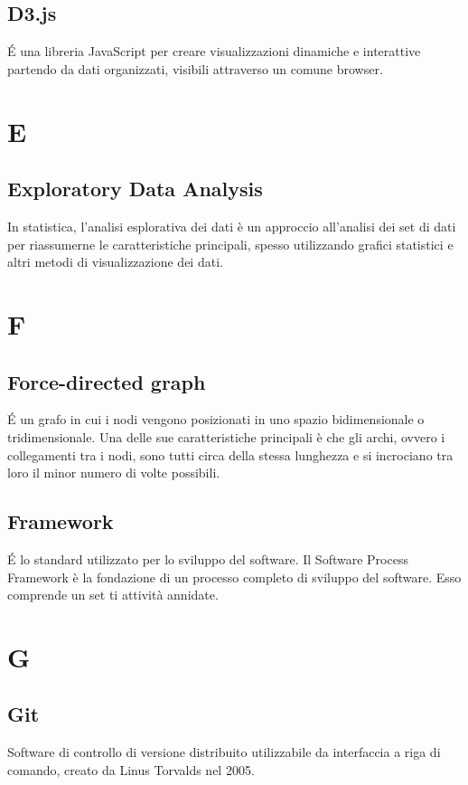 \subsection{D3.js}
\'E una libreria JavaScript per creare visualizzazioni dinamiche e interattive partendo da dati organizzati, visibili attraverso un comune browser.

\newpage
\section{E}
\subsection{Exploratory Data Analysis}
In statistica, l'analisi esplorativa dei dati è un approccio all'analisi dei set di dati per riassumerne le caratteristiche principali, spesso utilizzando grafici statistici e altri metodi di visualizzazione dei dati.

\newpage
\section{F}
\subsection{Force-directed graph}
\'E un grafo in cui i nodi vengono posizionati in uno spazio bidimensionale o tridimensionale. Una delle sue caratteristiche principali è che gli archi, ovvero i collegamenti tra i nodi, sono tutti circa della stessa lunghezza e si incrociano tra loro il minor numero di volte possibili.

\subsection{Framework}
\'E lo standard utilizzato per lo sviluppo del software. Il Software Process Framework è la fondazione di un processo completo di sviluppo
del software. Esso comprende un set ti attività annidate.

\newpage
\section{G}
\subsection{Git}
Software di controllo di versione distribuito utilizzabile da interfaccia a riga di comando, creato da Linus Torvalds nel 2005.

